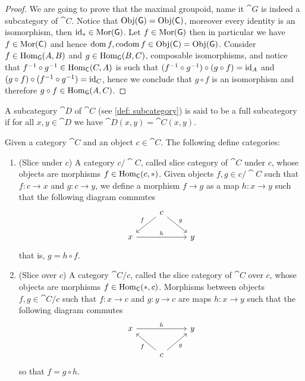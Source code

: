 \begin{proof}
  We are going to prove that the maximal groupoid, name it \(\cat G\) is indeed
  a subcategory of \(\cat C\). Notice that \(\operatorname{Obj}(\mathsf G) = \operatorname{Obj}(\mathsf C)\),
  moreover every identity is an isomorphism, then \(\operatorname{id}_{*} \in \operatorname{Mor}(\mathsf G)\).
  Let \(f \in \operatorname{Mor}(\mathsf G)\) then in particular we have \(f \in \operatorname{Mor}(\mathsf C)\)
  and hence \(\operatorname{dom} f, \operatorname{codom} f \in \operatorname{Obj}(\mathsf C) =
  \operatorname{Obj}(\mathsf G)\). Consider \(f \in \operatorname{Hom}_{\mathsf G}(A, B)\) and \(g \in \operatorname{Hom}_{\mathsf
  G}(B, C)\), composable isomorphisms, and notice that \(f^{-1} \circ g^{-1}
  \in \operatorname{Hom}_{\mathsf C}(C, A)\) is such that \((f^{-1} \circ g^{-1}) \circ (g \circ
  f) = \operatorname{id}_A\) and \((g \circ f) \circ (f^{-1} \circ g^{-1}) = \operatorname{id}_C\), hence we
  conclude that \(g \circ f\) is an isomorphism and therefore \(g \circ f \in
  \operatorname{Hom}_{\mathsf G}(A, C)\).
\end{proof}

\begin{definition}\label{def: full subcategory}
  A subcategory \(\cat D\) of \(\cat C\) (see \cref{def: subcategory}) is said
  to be a full subcategory if for all \(x, y \in \cat D\) we have \(\cat D(x, y)
  = \cat C(x, y)\).
\end{definition}

\begin{proposition}\label{prop: slice cat}
  Given a category \(\cat C\) and an object \(c \in \cat C\). The following
  define categories:
  \begin{enumerate}[(SC1)]
    \item\label{prop: slice under}
      (Slice under \(c\)) A category \(c/\cat C\), called slice category of
      \(\cat C\) under \(c\), whose objects are morphisms \(f \in \operatorname{Hom}_{\mathsf
      C}(c, *)\). Given objects \(f, g \in c/\cat C\) such that \(f: c \to x\)
      and \(g: c \to y\), we define a morphism \(f \to g\) as a map \(h: x \to
      y\) such that the following diagram commutes
      \[
        \begin{tikzcd}
          &c \ar[dl, swap,"f"] \ar[dr, "g"]\\
          x \ar[rr, "h"] & &y
        \end{tikzcd}
      \] 
      that is, \(g = h \circ f\).
    \item\label{prop: slice over} 
      (Slice over \(c\)) A category \(\cat C/c\), called the slice category of
      \(\cat C\) over \(c\), whose objects are morphisms \(f \in \operatorname{Hom}_{\mathsf
      C}(*, c)\). Morphisms between objects \(f, g \in \cat C/c\) such that \(f:
      x \to c\) and \(g: y \to c\) are maps \(h: x \to y\) such that the
      following diagram commutes 
      \[
        \begin{tikzcd}
          x \ar[rr, "h"]
            & &y \\
            &c \ar[ul, "f"] \ar[ur, swap, "g"]
        \end{tikzcd}
      \]
      so that \(f = g \circ h\).
  \end{enumerate}
\end{proposition}

